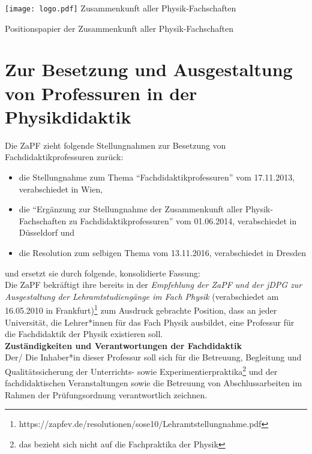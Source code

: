 \documentclass[DIV=calc]{scrartcl}
\begin{document}
    \hspace{0.87\textwidth}
    \begin{minipage}{120pt}
        \vspace{-1.8cm}
        \texttt{[image: logo.pdf]}
        \centering
        \small Zusammenkunft aller Physik-Fachschaften
    \end{minipage}
    \begin{center}
        \huge{Positionspapier der Zusammenkunft aller Physik-Fachschaften}\vspace{.25\baselineskip}\\
        \normalsize
    \end{center}
    \vspace{1cm} 
    \section*{Zur Besetzung und Ausgestaltung von Professuren in der Physikdidaktik}
Die ZaPF zieht folgende Stellungnahmen zur Besetzung von Fachdidaktikprofessuren zurück:
\begin{itemize}
\item die Stellungnahme zum Thema "`Fachdidaktikprofessuren"' vom 17.11.2013, verabschiedet in Wien,
\item die "`Ergänzung zur Stellungnahme der Zusammenkunft aller Physik-Fachschaften zu Fachdidaktikprofessuren"' vom 01.06.2014, verabschiedet in Düsseldorf und
\item die Resolution zum selbigen Thema vom 13.11.2016, verabschiedet in Dresden
\end{itemize}
und ersetzt sie durch folgende, konsolidierte Fassung:
\vspace{0.5\baselineskip}\\
Die ZaPF bekräftigt ihre bereits in der \textit{Empfehlung der ZaPF und der jDPG zur Ausgestaltung der Lehramtstudiengänge im Fach Physik}
(verabschiedet am 16.05.2010 in Frankfurt)\footnote{https://zapfev.de/resolutionen/sose10/Lehramtstellungnahme.pdf} zum Ausdruck gebrachte Position, dass an jeder Universität, die Lehrer*innen für das Fach Physik ausbildet, eine Professur für die Fachdidaktik der Physik existieren soll.
\vspace{0.5\baselineskip}\\
\textbf{Zuständigkeiten und Verantwortungen der Fachdidaktik}\\
Der/ Die Inhaber*in dieser Professur soll sich für die Betreuung, Begleitung und Qualitäts\-sicherung der Unterrichts- sowie Experimentierpraktika\footnote{das bezieht sich nicht auf die Fachpraktika der Physik} und der fachdidaktischen Veranstaltungen sowie die  Betreuung von Abschlussarbeiten im Rahmen der Prüfungsordnung verantwortlich zeichnen.\\
\end{document}
